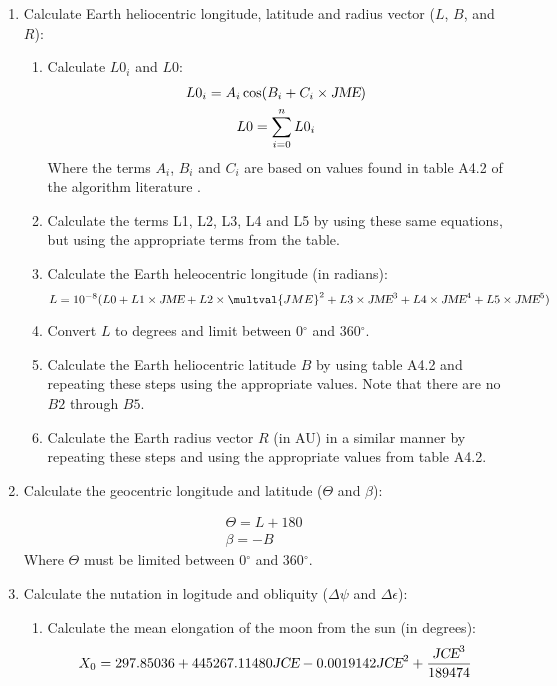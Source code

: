 {\begin{enumerate}
\item Calculate Earth heliocentric longitude, latitude and radius vector ($L$, $B$, and $R$):
  \begin{enumerate}
    \item Calculate $L0_i$ and $L0$:
    \begin{gather*}
    L0_i = A_i \cos(B_i + C_i \times \text{\sl JME}) \\
    L0 = \sum \limits_{i=0}^n L0_i
    \end{gather*}
%
    Where the terms $A_i$, $B_i$ and $C_i$ are based on values found in table A4.2 of the algorithm
    literature \cite{Reda}.

    \item Calculate the terms L1, L2, L3, L4 and L5 by using these same equations, but using the
    appropriate terms from the table.

    \item Calculate the Earth heleocentric longitude (in radians):
    \begin{displaymath}
    L = 10^{-8} (L0 + L1 \times \multvar{JME} + L2 \times \multval{JME}^2 + L3 \times \multvar{JME}^3 + L4 \times \multvar{JME}^4 + L5 \times \multvar{JME}^5)
    \end{displaymath}

    \item Convert $L$ to degrees and limit between 0$^\circ$ and 360$^\circ$.

    \item Calculate the Earth heliocentric latitude $B$ by using table A4.2 and repeating
    these steps using the appropriate values. Note that there are no $B2$ through $B5$.

    \item Calculate the Earth radius vector $R$ (in AU) in a similar manner by repeating these steps
    and using the appropriate values from table A4.2.

  \end{enumerate}
  
\item Calculate the geocentric longitude and latitude ($\Theta$ and $\beta$):

\begin{gather*}
\Theta = L + 180 \\
\beta = - B 
\end{gather*}
%
Where $\Theta$ must be limited between 0$^\circ$ and 360$^\circ$.

\item Calculate the nutation in logitude and obliquity ($\Delta \psi$ and $\Delta \epsilon$):
  \begin{enumerate}
  \item Calculate the mean elongation of the moon from the sun (in degrees):
      \begin{displaymath}
      X_0 = 297.85036 + 445267.11480 \text{\sl JCE} - 0.0019142 \text{\sl JCE}^2 + \frac{\text{\sl JCE}^3}{189474}
      \end{displaymath}


\end{enumerate}
\end{enumerate}}
